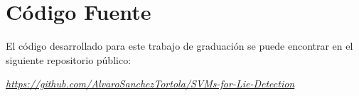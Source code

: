 \chapter{Código Fuente}
El código desarrollado para este trabajo de graduación se puede encontrar en el siguiente repositorio público:

\underline{\textit{https://github.com/AlvaroSanchezTortola/SVMs-for-Lie-Detection}}

\textcolor{white}{ \cite{Thai2012} \cite{Boser1992} \cite{Wolpe2010}  \cite{Chih-WeiHsuChih-ChungChang2008} \cite{Tzotsos2006} \cite{Davatzikos2005} \cite{Revell2004} \cite{EPOC2003} \cite{EMOTIV2014} \cite{Umale2016} \cite{Russell2010} \cite{Belmonte2007} \cite{Alpaydn2014} \cite{Aydemir2013} \cite{James1985} \cite{Vicianova2015} \cite{Ekman2009} \cite{Tan2006} \cite{Irimia-Dieguez2015} \cite{Park2013} }